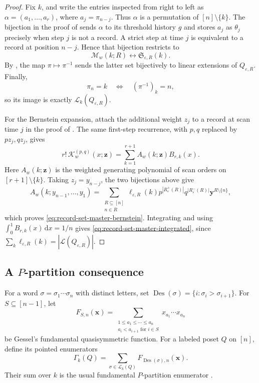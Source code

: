\documentclass[11pt,letterpaper,reqno]{amsart}
\theoremstyle{definition}
\newcommand{\dd}{\,\mathrm{d}}
\newcommand{\eps}{\varepsilon}
\begin{document}
\begin{proof}
Fix \(k\), and write the entries inspected from right to left as
\(\alpha=(a_1,\ldots,a_r)\), where \(a_j=\pi_{n-j}\).  Thus \(\alpha\) is a
permutation of \([n]\setminus\{k\}\).  The bijection in the proof of
 sends \(\alpha\) to its threshold history
\(g\) and stores \(a_j\) as \(\theta_j\) precisely when step \(j\) is not a
record.  A strict step at time \(j\) is equivalent to a record at position
\(n-j\).  Hence that bijection restricts to
\[
\mathcal M_w(k;R)\longleftrightarrow\mathfrak S_{\eps,R}(k).
\]
By , the map
\(\pi\mapsto\pi^{-1}\) sends the latter set bijectively to linear extensions
of \(Q_{\eps,R}\).  Finally,
\[
\pi_n=k\quad\Longleftrightarrow\quad (\pi^{-1})_k=n,
\]
so its image is exactly \(\mathcal L_k(Q_{\eps,R})\).

For the Bernstein expansion, attach the additional weight \(z_j\) to a
record at scan time \(j\) in the proof of
.  The same first-step recurrence, with
\(p,q\) replaced by \(pz_j,qz_j\), gives
\[
r!\,\mathscr K_w^{(p,q)}(x;\mathbf z)
 =\sum_{k=1}^{r+1}A_w(k;\mathbf z)B_{r,k}(x).
\]
Here \(A_w(k;\mathbf z)\) is the weighted generating polynomial of scan
orders on \([r+1]\setminus\{k\}\).  Taking \(z_j=y_{n-j}\), the two
bijections above give
\[
A_w(k;y_{n-1},\ldots,y_1)
 =\sum_{\substack{R\subseteq[n]\\n\in R}}
 \ell_{\eps,R}(k)
 p^{|R_\eps^+(R)|}q^{|R_\eps^-(R)|}
 \mathbf y^{R\setminus\{n\}},
\]
which proves \eqref{eq:record-set-master-bernstein}.  Integrating and using
\(\int_0^1B_{r,k}(x)\dd x=1/n\) gives
\eqref{eq:record-set-master-integrated}, since
\(\sum_k\ell_{\eps,R}(k)=|\mathcal L(Q_{\eps,R})|\).
\end{proof}

\subsection{A \texorpdfstring{\(P\)}{P}-partition consequence}
\label{sec:qsym-record-lift}

For a word \(\sigma=\sigma_1\cdots\sigma_n\) with distinct letters, set
\(\operatorname{Des}(\sigma)=\{i:\sigma_i>\sigma_{i+1}\}\).  For
\(S\subseteq[n-1]\), let
\[
F_{S,n}(\mathbf x)
=
\sum_{\substack{1\le a_1\le\cdots\le a_n\\
                 a_i<a_{i+1}\text{ for }i\in S}}
x_{a_1}\cdots x_{a_n}
\]
be Gessel's fundamental quasisymmetric function.  For a labeled poset \(Q\)
on \([n]\), define its pointed enumerators
\[
\Gamma_k(Q)=
\sum_{\sigma\in\mathcal L_k(Q)}
F_{\operatorname{Des}(\sigma),n}(\mathbf x).
\]
Their sum over \(k\) is the usual fundamental \(P\)-partition enumerator
\cite{StanleyPPartitions,Gessel1984}.
\end{document}
